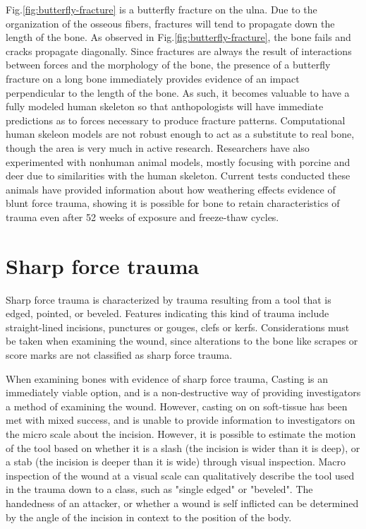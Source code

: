 \documentclass[titlepage]{article}
\begin{document}
Fig.\ref{fig:butterfly-fracture} is a butterfly fracture on the ulna. Due to the organization of the osseous fibers, fractures will tend to propagate down the length of the bone.\cite{mechanics} As observed in Fig.\ref{fig:butterfly-fracture}, the bone fails and cracks propagate diagonally. Since fractures are always the result of interactions between forces and the morphology of the bone, the presence of a butterfly fracture on a long bone immediately provides evidence of an impact perpendicular to the length of the bone. As such, it becomes valuable to have a fully modeled human skeleton so that anthopologists will have immediate predictions as to forces necessary to produce fracture patterns. Computational human skeleon models are not robust enough to act as a substitute to real bone, though the area is very much in active research. Researchers have also experimented with nonhuman animal models, mostly focusing with porcine and deer due to similarities with the human skeleton. Current tests conducted these animals have provided information about how weathering effects evidence of blunt force trauma, showing it is possible for bone to retain characteristics of trauma even after 52 weeks of exposure and freeze-thaw cycles.\cite{bft}

\newpage
\section{Sharp force trauma}
Sharp force trauma is characterized by trauma resulting from a tool that is edged, pointed, or beveled. Features indicating this kind of trauma include straight-lined incisions, punctures or gouges, clefs or kerfs. Considerations must be taken when examining the wound, since alterations to the bone like scrapes or score marks are not classified as sharp force trauma. \cite{trauma}

When examining bones with evidence of sharp force trauma, Casting is an immediately viable option, and is a non-destructive way of providing investigators a method of examining the wound. However, casting on on soft-tissue has been met with mixed success, and is unable to provide information to investigators on the micro scale about the incision. However, it is possible to estimate the motion of the tool based on whether it is a slash (the incision is wider than it is deep), or a stab (the incision is deeper than it is wide) through visual inspection. \cite{serrated} Macro inspection of the wound at a visual scale can qualitatively describe the tool used in the trauma down to a class, such as "single edged" or "beveled". The handedness of an attacker, or whether a wound is self inflicted can be determined by the angle of the incision in context to the position of the body.
\end{document}

